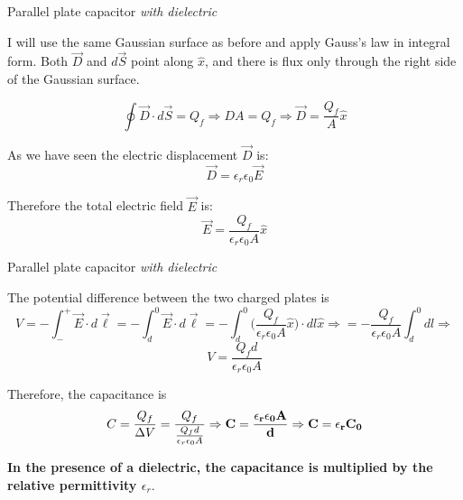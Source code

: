 %
%
%

\begin{frame}{Parallel plate capacitor {\em with dielectric}}

I will use the same Gaussian surface as before and apply Gauss's law in integral form.
Both $\vec{D}$ and $d\vec{S}$ point along $\hat{x}$,
and there is flux only through the right side of the Gaussian surface.

\begin{equation*}
   \oint \vec{D} \cdot d\vec{S} = Q_{f} \Rightarrow D A = Q_{f} \Rightarrow \vec{D} = \frac{Q_{f}}{A} \hat{x}
\end{equation*}

As we have seen the electric displacement $\vec{D}$ is:
\begin{equation*}
   \vec{D} = \epsilon_{r} \epsilon_{0} \vec{E}
\end{equation*}

Therefore the total electric field $\vec{E}$ is:
\begin{equation*}
   \vec{E} = \frac{Q_{f}}{\epsilon_{r} \epsilon_{0} A} \hat{x}
\end{equation*}

\end{frame}

%
%
%

\begin{frame}{Parallel plate capacitor {\em with dielectric}}

The potential difference between the two charged plates is
\begin{equation*}
    V = - \int_{-}^{+} \vec{E} \cdot d\vec{\ell} =  - \int_{d}^{0} \vec{E} \cdot d\vec{\ell}
      = - \int_{d}^{0} \Big( \frac{Q_{f}}{\epsilon_{r} \epsilon_{0} A} \hat{x} \Big) \cdot dl \hat{x} \Rightarrow
      = - \frac{Q_{f}}{\epsilon_{r} \epsilon_{0} A} \int_{d}^{0} dl \Rightarrow
\end{equation*}
\begin{equation*}
    V = \frac{Q_{f} d}{\epsilon_{r} \epsilon_{0} A}
\end{equation*}

Therefore, the capacitance is
\begin{equation*}
       C = \frac{Q_{f}}{{\Delta}V} = \frac{Q_{f}}{\frac{Q_{f} d}{\epsilon_{r} \epsilon_{0} A}} \Rightarrow
  {\bf C = \frac{\epsilon_{r} \epsilon_{0} A}{d} } \Rightarrow
  {\bf C = \epsilon_{r} C_{0}}
\end{equation*}

{\bf In the presence of a dielectric,
the capacitance is multiplied by the relative permittivity $\epsilon_{r}$}.\\

\end{frame}

